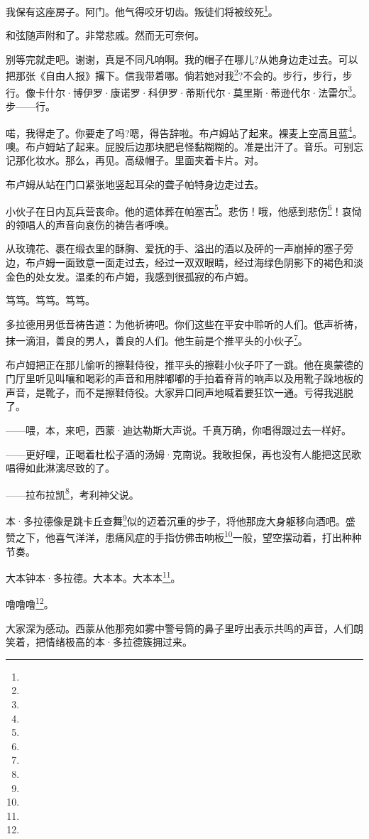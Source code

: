 \par 我保有这座房子。阿门。他气得咬牙切齿。叛徒们将被绞死\footnote{}。
\par 和弦随声附和了。非常悲戚。然而无可奈何。
\par 别等完就走吧。谢谢，真是不同凡响啊。我的帽子在哪儿?从她身边走过去。可以把那张《自由人报》撂下。信我带着哪。倘若她对我\footnote{}?不会的。步行，步行，步行。像卡什尔·博伊罗·康诺罗·科伊罗·蒂斯代尔·莫里斯·蒂逊代尔·法雷尔\footnote{}。步——行。
\par 喏，我得走了。你要走了吗?嗯，得告辞啦。布卢姆站了起来。裸麦上空高且蓝\footnote{}。噢。布卢姆站了起来。屁股后边那块肥皂怪黏糊糊的。准是出汗了。音乐。可别忘记那化妆水。那么，再见。高级帽子。里面夹着卡片。对。
\par 布卢姆从站在门口紧张地竖起耳朵的聋子帕特身边走过去。
\par 小伙子在日内瓦兵营丧命。他的遗体葬在帕塞吉\footnote{}。悲伤！哦，他感到悲伤\footnote{}！哀恸的领唱人的声音向哀伤的祷告者呼唤。
\par 从玫瑰花、裹在缎衣里的酥胸、爱抚的手、溢出的酒以及砰的一声崩掉的塞子旁边，布卢姆一面致意一面走过去，经过一双双眼睛，经过海绿色阴影下的褐色和淡金色的处女发。温柔的布卢姆，我感到很孤寂的布卢姆。
\par 笃笃。笃笃。笃笃。
\par 多拉德用男低音祷告道：为他祈祷吧。你们这些在平安中聆听的人们。低声祈祷，抹一滴泪，善良的男人，善良的人们。他生前是个推平头的小伙子\footnote{}。
\par 布卢姆把正在那儿偷听的擦鞋侍役，推平头的擦鞋小伙子吓了一跳。他在奥蒙德的门厅里听见叫嚷和喝彩的声音和用胖嘟嘟的手拍着脊背的响声以及用靴子跺地板的声音，是靴子，而不是擦鞋侍役。大家异口同声地喊着要狂饮一通。亏得我逃脱了。
\par ——喂，本，来吧，西蒙·迪达勒斯大声说。千真万确，你唱得跟过去一样好。
\par ——更好哩，正喝着杜松子酒的汤姆·克南说。我敢担保，再也没有人能把这民歌唱得如此淋漓尽致的了。
\par ——拉布拉凯\footnote{}，考利神父说。
\par 本·多拉德像是跳卡丘查舞\footnote{}似的迈着沉重的步子，将他那庞大身躯移向酒吧。盛赞之下，他喜气洋洋，患痛风症的手指仿佛击响板\footnote{}一般，望空摆动着，打出种种节奏。
\par 大本钟本·多拉德。大本本。大本本\footnote{}。
\par 噜噜噜\footnote{}。
\par 大家深为感动。西蒙从他那宛如雾中警号筒的鼻子里哼出表示共鸣的声音，人们朗笑着，把情绪极高的本·多拉德簇拥过来。
